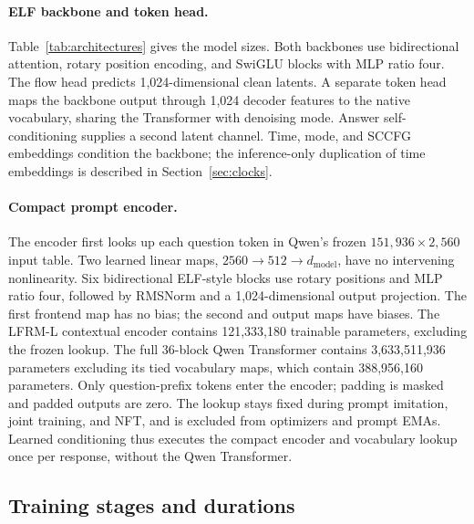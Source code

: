 \documentclass{article}
\begin{document}
\paragraph{ELF backbone and token head.}
Table~\ref{tab:architectures} gives the model sizes. Both backbones use bidirectional attention, rotary position encoding, and SwiGLU blocks with MLP ratio four. The flow head predicts 1,024-dimensional clean latents. A separate token head maps the backbone output through 1,024 decoder features to the native vocabulary, sharing the Transformer with denoising mode. Answer self-conditioning supplies a second latent channel. Time, mode, and SCCFG embeddings condition the backbone; the inference-only duplication of time embeddings is described in Section~\ref{sec:clocks}.

\paragraph{Compact prompt encoder.}
The encoder first looks up each question token in Qwen's frozen $151{,}936\times2{,}560$ input table. Two learned linear maps, $2560\to512\to d_{\mathrm{model}}$, have no intervening nonlinearity. Six bidirectional ELF-style blocks use rotary positions and MLP ratio four, followed by RMSNorm and a 1,024-dimensional output projection. The first frontend map has no bias; the second and output maps have biases. The LFRM-L contextual encoder contains 121,333,180 trainable parameters, excluding the frozen lookup. The full 36-block Qwen Transformer contains 3,633,511,936 parameters excluding its tied vocabulary maps, which contain 388,956,160 parameters. Only question-prefix tokens enter the encoder; padding is masked and padded outputs are zero. The lookup stays fixed during prompt imitation, joint training, and NFT, and is excluded from optimizers and prompt EMAs. Learned conditioning thus executes the compact encoder and vocabulary lookup once per response, without the Qwen Transformer.

\subsection{Training stages and durations}
\label{app:trainingstages}
\end{document}
